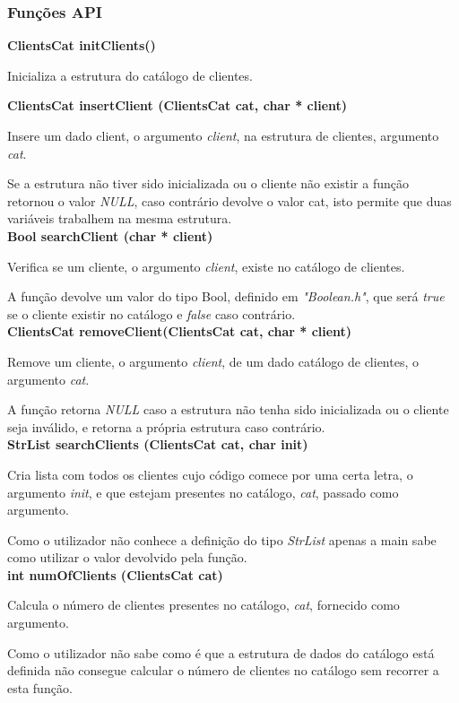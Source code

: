 \documentclass[10pt] {article}
\begin{document}
\subsubsection{Funções API}

\noindent\textbf{ClientsCat initClients()}
\par Inicializa a estrutura do catálogo de clientes.

\noindent\textbf{ClientsCat insertClient (ClientsCat cat, char * client)}
\par Insere um dado client, o argumento \emph{client}, na estrutura de clientes, argumento \emph{cat}.
\par Se a estrutura não tiver sido inicializada ou o cliente não existir a função retornou o valor \emph{NULL},
caso contrário devolve o valor cat, isto permite que duas variáveis trabalhem na mesma estrutura. \\

\noindent \textbf {Bool searchClient (char * client)}
\par Verifica se um cliente, o argumento \emph{client}, existe no catálogo de clientes.
\par A função devolve um valor do tipo Bool, definido em \emph{"Boolean.h"}, que será \emph{true} se o
cliente existir no catálogo e \emph{false} caso contrário. \\

\noindent \textbf{ClientsCat removeClient(ClientsCat cat, char * client)}
\par Remove um cliente, o argumento \emph{client}, de um dado catálogo de clientes, o argumento \emph{cat}.
\par A função retorna \emph{NULL} caso a estrutura não tenha sido inicializada ou o cliente seja inválido, e
retorna a própria estrutura caso contrário. \\

\noindent \textbf{StrList searchClients (ClientsCat cat, char init)}
\par Cria lista com todos os clientes cujo código comece por uma certa letra, o argumento \emph{init}, e que
estejam presentes no catálogo, \emph{cat}, passado como argumento.
\par Como o utilizador não conhece a definição do tipo \emph{StrList} apenas a main sabe como utilizar
o valor devolvido pela função. \\

\noindent \textbf{int numOfClients (ClientsCat cat)}
\par Calcula o número de clientes presentes no catálogo, \emph{cat}, fornecido como argumento.
\par Como o utilizador não sabe como é que a estrutura de dados do catálogo está definida não consegue
calcular o número de clientes no catálogo sem recorrer a esta função. \\
\end{document}
